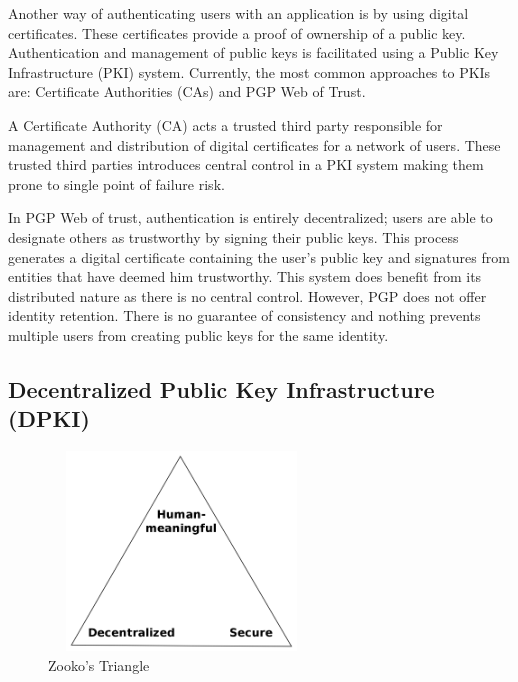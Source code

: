 	Another way of authenticating users with an application is by using digital certificates\cite{tycksen2001digital}. These certificates provide a proof of ownership of a public key. Authentication and management of public keys is facilitated using a Public Key Infrastructure (PKI)\cite{adams2003understanding} system. Currently, the most common approaches to PKIs are: Certificate Authorities (CAs) and PGP Web of Trust\cite{abdul1997pgp}. 
	
	A Certificate Authority (CA) acts a trusted third party responsible for management and distribution of digital certificates for a network of users\cite{fromknecht2014decentralized}. These trusted third parties introduces central control in a PKI system making them prone to single point of failure risk\cite{dooley2001designing}.
	
	In PGP Web of trust, authentication is entirely decentralized; users are able to designate others as trustworthy by signing their public keys. This process generates a digital certificate containing the user's public key and signatures from entities that have deemed him trustworthy. This system does benefit from its distributed nature as there is no central control. However, PGP does not offer identity retention. There is no guarantee of consistency and nothing prevents multiple users from creating public keys for the same identity\cite{fromknecht2014decentralized}.
	
	\subsection{Decentralized Public Key Infrastructure (DPKI)}
		\begin{figure}[h]
			\centering
			\includegraphics[width=200pt, height=150pt]{figures/zooko-triangle}
			\caption{\label{fig:zooko-triangle} Zooko's Triangle\protect\footnotemark}
		\end{figure}
		
